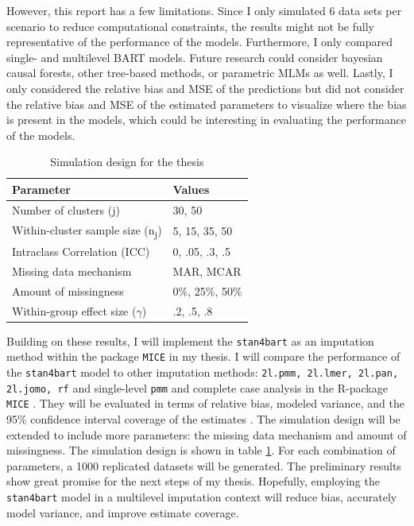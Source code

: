 \documentclass[10pt, a4paper, titlepage]{article}
\begin{document}
However, this report has a few limitations. Since I only simulated 6 data sets per scenario to reduce computational constraints, the results might not be fully representative of the performance of the models. Furthermore, I only compared single- and multilevel BART models. Future research could consider bayesian causal forests, other tree-based methods, or parametric MLMs as well. Lastly, I only considered the relative bias and MSE of the predictions but did not consider the relative bias and MSE of the estimated parameters to visualize where the bias is present in the models, which could be interesting in evaluating the performance of the models.

\begin{table}
\centering
\caption{Simulation design for the thesis}
\label{tab:simulationparameters2}
\begin{tabular}{l|l}
\textbf{Parameter}                                  & \textbf{Values} \\ \hline
Number of clusters (j)                              & 30, 50          \\
Within-cluster sample size (n\textsubscript{j})     & 5, 15, 35, 50   \\
Intraclass Correlation (ICC)                        & 0, .05, .3, .5  \\
Missing data mechanism                              & MAR, MCAR       \\
Amount of missingness                               & 0\%, 25\%, 50\% \\
Within-group effect size ($\gamma$)                 & .2, .5, .8
\end{tabular}
\end{table}

Building on these results, I will implement the \texttt{stan4bart} as an imputation method within the package \texttt{MICE} \citep{buuren2011} in my thesis. I will compare the performance of the \texttt{stan4bart} model to other imputation methods: \texttt{2l.pmm, 2l.lmer, 2l.pan, 2l.jomo, rf} and single-level \texttt{pmm} and complete case analysis in the R-package \texttt{MICE} \citep{buuren2011}. They will be evaluated in terms of relative bias, modeled variance, and the 95\% confidence interval coverage of the estimates \citep{oberman2023}. The simulation design will be extended to include more parameters: the missing data mechanism and amount of missingness. The simulation design is shown in table \ref{tab:simulationparameters2}. For each combination of parameters, a 1000 replicated datasets will be generated. The preliminary results show great promise for the next steps of my thesis. Hopefully, employing the \texttt{stan4bart} model in a multilevel imputation context will reduce bias, accurately model variance, and improve estimate coverage.

\newpage


\end{document}
